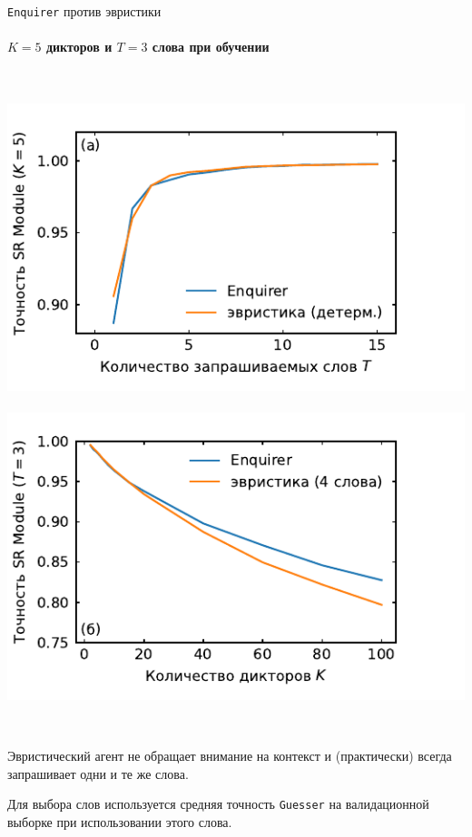 \documentclass[aspectratio=43]{beamer}
\newcommand{\guesser}{\texttt{Guesser}}
\newcommand{\enquirer}{\texttt{Enquirer}}
\newcommand{\imgscale}{0.67}
\begin{document}
\begin{frame}[t]{\enquirer{} против эвристики}
    \framesubtitle{$K = 5$ дикторов  и $T = 3$ слова при обучении}
    \begin{columns}[T]
        \centering
        \mbox{
            \includegraphics[scale=\imgscale]{../plots/old/word_sweep_heuristic.pdf}%
        }
        \mbox{
            \includegraphics[scale=\imgscale]{../plots/old/guest_sweep_heuristic.pdf}
        }
    \end{columns}\vspace*{1em}

    Эвристический агент не обращает внимание на контекст и (практически) всегда
    запрашивает одни и те же слова.\vspace{1em}

    Для выбора слов используется средняя точность \guesser{} на валидационной
    выборке при использовании этого слова.
\end{frame}
\end{document}
